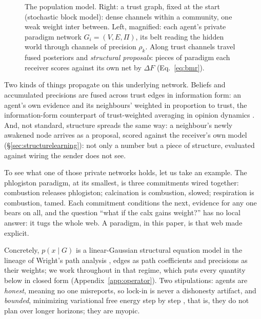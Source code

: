 \documentclass[runningheads]{llncs}
\begin{document}
\begin{figure}[h!]
{}
\caption{The population model. Right: a trust graph, fixed at the start (stochastic block
model): dense channels within a community, one weak weight inter between. Left,
magnified: each agent's private paradigm network $G_i=(V,E,\Pi)$, its belt reading the hidden
world through channels of precision $\rho_k$. Along trust channels travel fused posteriors and
\emph{structural proposals}: pieces of paradigm each receiver scores against its own net by
$\Delta F$ (Eq.~\ref{eq:bmr}).}
\label{fig:population}
\end{figure}

Two kinds of things propagate on this underlying network. Beliefs and accumulated precisions
are fused across trust edges in information form: an agent's own evidence and its neighbours'
weighted in proportion to trust, the information-form counterpart of trust-weighted averaging
in opinion dynamics \citep{degroot1974,acemoglu2011}. And, not standard, structure
spreads the same way: a neighbour's newly awakened node arrives as a proposal, scored against
the receiver's own model (\S\ref{sec:structurelearning}): not only a number but a piece of
structure, evaluated against wiring the sender does not see.

To see what one of those private networks holds, let us take an example. The
phlogiston paradigm, at its smallest, is three commitments wired together:
combustion releases phlogiston; calcination is combustion, slowed; respiration is combustion,
tamed. Each commitment conditions the next, evidence for any one bears on all, and the question
``what if the calx gains weight?'' has no local answer: it tugs the whole web. A
paradigm, in this paper, is that web made explicit.

Concretely, $p(x\mid G)$ is a linear-Gaussian structural equation model in the lineage of
Wright's path analysis \citep{wright1934}, edges as path coefficients and precisions as their
weights; we work throughout in that regime, which puts every quantity below in closed form
(Appendix~\ref{app:operator}). Two stipulations: agents are \emph{honest}, meaning no one
misreports, so lock-in is never a dishonesty artifact, and \emph{bounded}, minimizing variational free
energy step by step \citep{dacosta2020}, that is, they do not plan over longer horizons; they
are myopic.
\end{document}
